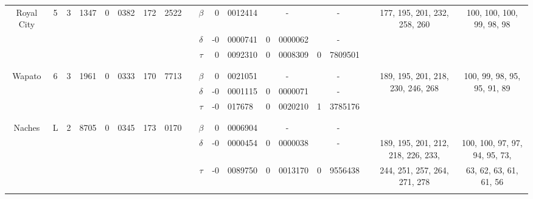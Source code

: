 \begin{tabular*}{290mm}{ccr@{.}lr@{.}lr@{.}lccr@{.}lr@{.}lr@{.}lccc}
		Royal City	& {5}		& 	3&1347 			& 0&0382  			&  172&2522		 & & {\bf{$\beta$}}  &  0&0012414				  &  \multicolumn{2}{c}{ - }			&  \multicolumn{2}{c}{ - }		& & \multirow{3}{*}{177, 195, 201, 232, 258, 260}	& \multirow{3}{*}{100, 100, 100, 99, 98, 98} \\
				& 		& 	\multicolumn{2}{c}{  }	& \multicolumn{2}{c}{  }	& \multicolumn{2}{c}{  } & & {\bf{$\delta$}} & -0&0000741				  &  0&0000062					&  \multicolumn{2}{c}{ - }		& &  							&  \\
				& 		& 	\multicolumn{2}{c}{  }	& \multicolumn{2}{c}{  }	& \multicolumn{2}{c}{  } & & {\bf{$\tau$}}   &  0&0092310				  &  0&0008309					&  0&7809501 				& & 							&  \\		
				\multicolumn{19}{c}{ } \\
				\cline{3-19}
				\multicolumn{19}{c}{ } \\
		Wapato		& {6}		& 	3&1961 			& 0&0333  			&  170&7713		 & & {\bf{$\beta$}}  &  0&0021051				  &  \multicolumn{2}{c}{ - }			&  \multicolumn{2}{c}{ - }		& & \multirow{3}{*}{189, 195, 201, 218, 230, 246, 268}	& \multirow{3}{*}{100, 99, 98, 95, 95, 91, 89} \\
				& 		& 	\multicolumn{2}{c}{  }	& \multicolumn{2}{c}{  }	& \multicolumn{2}{c}{  } & & {\bf{$\delta$}} & -0&0001115				  &  0&0000071					&  \multicolumn{2}{c}{ - }		& &  							&  \\
				& 		& 	\multicolumn{2}{c}{  }	& \multicolumn{2}{c}{  }	& \multicolumn{2}{c}{  } & & {\bf{$\tau$}}   & -0&017678				  &  0&0020210					&  1&3785176 				& & 							&  \\		
				\multicolumn{19}{c}{ } \\
				\cline{3-19}
				\cline{3-19}
				\multicolumn{19}{c}{ } \\
		Naches		& {L}		& 	2&8705 			& 0&0345  			&  173&0170		 & & {\bf{$\beta$}}  &  0&0006904				  &  \multicolumn{2}{c}{ - }			&  \multicolumn{2}{c}{ - }		& & 							&  \\
				& 		& 	\multicolumn{2}{c}{  }	& \multicolumn{2}{c}{  }	& \multicolumn{2}{c}{  } & & {\bf{$\delta$}} & -0&0000454				  &  0&0000038					&  \multicolumn{2}{c}{ - }		& & {189, 195, 201, 212, 218, 226, 233, } 		& {100, 100, 97, 97, 94, 95, 73, } \\
				& 		& 	\multicolumn{2}{c}{  }	& \multicolumn{2}{c}{  }	& \multicolumn{2}{c}{  } & & {\bf{$\tau$}}   & -0&0089750				  &  0&0013170					&  0&9556438 				& & {244, 251, 257, 264, 271, 278} 			& {63, 62, 63, 61, 61, 56} \\		
		 \multicolumn{19}{c}{ } \\
		\hline
		\hline
		\end{tabular*}
			



